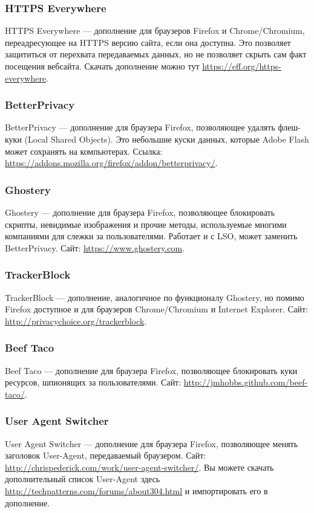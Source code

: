 \subsubsection{HTTPS Everywhere}
HTTPS Everywhere --- дополнение для браузеров Firefox и Chrome/Chromium, переадресующее на HTTPS версию сайта, если она доступна. Это позволяет защититься от перехвата передаваемых данных, но не позволяет скрыть сам факт посещения вебсайта. Скачать дополнение можно тут \url{https://eff.org/https-everywhere}.
\subsubsection{BetterPrivacy}
BetterPrivacy --- дополнение для браузера Firefox, позволяющее удалять флеш-куки (Local Shared Objects). Это небольшие куски данных, которые Adobe Flash может сохранять на компьютерах. Ссылка: \url{https://addons.mozilla.org/firefox/addon/betterprivacy/}.
\subsubsection{Ghostery}
Ghostery --- дополнение для браузера Firefox, позволяющее блокировать скрипты, невидимые изображения и прочие методы, используемые многими компаниями для слежки за пользователями. Работает и с LSO, может заменить BetterPrivacy. Сайт: \url{https://www.ghostery.com}.
\subsubsection{TrackerBlock}
TrackerBlock --- дополнение, аналогичное по функционалу Ghostery, но помимо Firefox доступное и для браузеров Chrome/Chromium и Internet Explorer. Сайт: \url{http://privacychoice.org/trackerblock}.
\subsubsection{Beef Taco}
Beef Taco --- дополнение для браузера Firefox, позволяющее блокировать куки ресурсов, шпионящих за пользователями. Сайт: \url{http://jmhobbs.github.com/beef-taco/}.
\subsubsection{User Agent Switcher}
User Agent Switcher --- дополнение для браузера Firefox, позволяющее менять заголовок User-Agent, передаваемый браузером. Сайт: \url{http://chrispederick.com/work/user-agent-switcher/}. Вы можете скачать дополнительный список User-Agent здесь \url{http://techpatterns.com/forums/about304.html} и импортировать его в дополнение.

